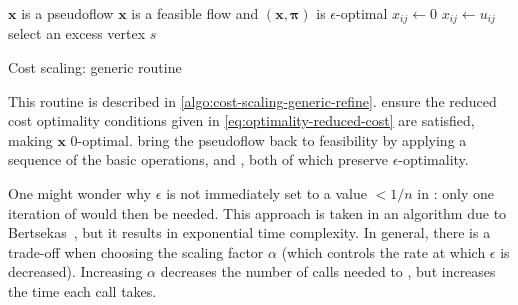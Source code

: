 \begin{algorithm}
    \begin{algorithmic}[1]
        \Require $\mathbf{x}$ is a pseudoflow
        \Ensure $\mathbf{x}$ is a feasible flow and $\left(\mathbf{x},\boldsymbol{\pi}\right)$ is $\epsilon$-optimal
              \label{algo:cost-scaling-generic-refine:start-init}
                 $x_{ij} \gets 0$ \EndIf
                 $x_{ij} \gets u_{ij}$ \EndIf
            \EndFor \label{algo:cost-scaling-generic-refine:end-init}
              \label{algo:cost-scaling-generic-refine:start-loop}
                \State select an excess vertex $s$ \label{algo:cost-scaling-generic-refine:select-vertex}
                 
                \label{algo:cost-scaling-generic-refine:call-push}
                \Else \enspace{}
                \EndIf
            \EndWhile \label{algo:cost-scaling-generic-refine:end-loop}
        \EndFunction
    \end{algorithmic}
    \caption{Cost scaling: generic  routine}
    \label{algo:cost-scaling-generic-refine}
\end{algorithm}

This routine is described in \cref{algo:cost-scaling-generic-refine}.  ensure the reduced cost optimality conditions given in \cref{eq:optimality-reduced-cost} are satisfied, making $\mathbf{x}$ $0$-optimal.  bring the pseudoflow back to feasibility by applying a sequence of the basic operations,  and , both of which preserve $\epsilon$-optimality.

One might wonder why $\epsilon$ is not immediately set to a value $< 1/n$ in : only one iteration of  would then be needed. This approach is taken in an algorithm due to Bertsekas~\cite{Bertsekas:1985}, but it results in exponential time complexity. In general, there is a trade-off when choosing the scaling factor $\alpha$ (which controls the rate at which $\epsilon$ is decreased). Increasing $\alpha$ decreases the number of calls needed to , but increases the time each call takes\footnotemark.

